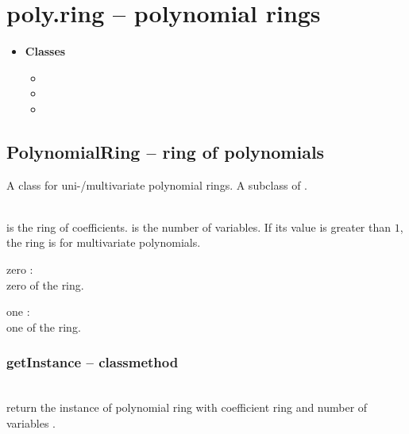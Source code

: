 

 \section{poly.ring -- polynomial rings}
 \begin{itemize}
   \item {\bf Classes}
   \begin{itemize}
     \item {}
     \item {}
     \item {}
   \end{itemize}
 \end{itemize}

\C

 \subsection{PolynomialRing -- ring of polynomials}
 A class for uni-/multivariate polynomial rings.
 A subclass of .

 \initialize
 \\
 \spacing
 \quad {} is the ring of coefficients.
  is the number of variables.
 If its value is greater than \(1\), the ring is for multivariate polynomials.
  \begin{at}
    \item[zero]:\\ zero of the ring.
    \item[one]:\\ one of the ring.
  \end{at}
 \method
 \subsubsection{getInstance -- classmethod}
 \\
 \spacing
 \quad return the instance of polynomial ring with coefficient ring
  and number of variables .

